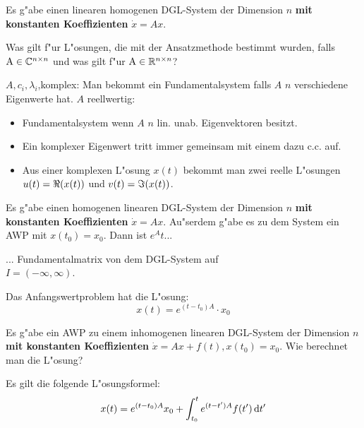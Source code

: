 \documentclass[9pt]{article}
\newcommand{\R}[1]{%
	\ifthenelse{\equal{#1}{}}
		{\mathbb{R}}
		{\mathbb{R}^{#1}}}%
\newcommand{\C}[1]{%
	\ifthenelse{\equal{#1}{}}
	{\mathbb{C}}
	{\mathbb{C}^{#1}}}%
\newenvironment{field}{}{\newpage}
\newif\ifnote
\newenvironment{note}{\notetrue}{\notefalse}
\newcommand{\localtag}{}
\newcommand{\globaltag}{}
\newcommand{\uuid}{}
\newcommand{\tags}[1]{
    \ifnote 
        \renewcommand{\localtag}{#1}
    \else
        \renewcommand{\globaltag}{#1}
    \fi 
    }
\newcommand{\xplain}[1]{\renewcommand{\uuid}{#1}}
\begin{document}
		\begin{note}
			\xplain{UUID}
			\tags{LDGLS, konstante-koeffizienten, 3.9}
			
			\begin{field}  %
				Es g"abe einen linearen homogenen  DGL-System der Dimension $n$
				\textbf{mit konstanten Koeffizienten}
				$\dot{x} = Ax$.

				 Was gilt f"ur L"osungen, die mit der Ansatzmethode bestimmt wurden, falls $\A \in \C{n\times n}$ und was gilt f"ur  $\A \in \R{n\times n}$?
			\end{field}
			
			\begin{field}  %
				$A,c_i, \lambda_i$,komplex: Man bekommt ein Fundamentalsystem falls $A$ $n$ verschiedene Eigenwerte hat.
				$A$ reellwertig:
				\begin{itemize}
					\item Fundamentalsystem wenn $A$ $n$ lin. unab. Eigenvektoren besitzt. 
					\item Ein komplexer Eigenwert tritt immer gemeinsam mit einem dazu c.c. auf.
					\item Aus einer komplexen L"osung $x(t)$ bekommt man zwei reelle L"osungen $u(t)= \real (x(t))$ und $v(t)=\imaginary (x(t))$.
				\end{itemize} 
			\end{field}
		\end{note}
		\begin{note}
			\xplain{UUID}
			\tags{LDGLS, konstante-koeffizienten, 3.9}
			
			\begin{field}  %
				Es g"abe einen homogenen linearen DGL-System der Dimension $n$
				\textbf{mit konstanten Koeffizienten}
				$\dot{x} = Ax$. Au"serdem g"abe es zu dem System ein AWP mit $x(t_0)=x_0$.
				Dann ist $e^At$...
			\end{field}
			
			\begin{field}  %
				... Fundamentalmatrix von dem DGL-System auf \\ ${I=(-\infty, \infty)}$.
				
				Das Anfangswertproblem hat die L"osung:
				\begin{equation*}
					x(t) = e^{(t-t_0) A} \cdot x_0
				\end{equation*}  
			\end{field}
				
			\begin{field}  %
				Es g"abe ein AWP zu einem inhomogenen linearen DGL-System der Dimension $n$
				\textbf{mit konstanten Koeffizienten}
				$\dot{x} = Ax+ f(t), x(t_0)=x_0$.
				Wie berechnet man die L"osung?
			\end{field}
			
			\begin{field}  %
				Es gilt die folgende L"osungsformel:
				\begin{equation}
					x(t) = e^{(t-t_0)A} x_0 + \int_{t_0}^{t}
					e^{(t-t')A}f(t')\dif t'
				\end{equation}
			\end{field}
		\end{note}
\end{document}
